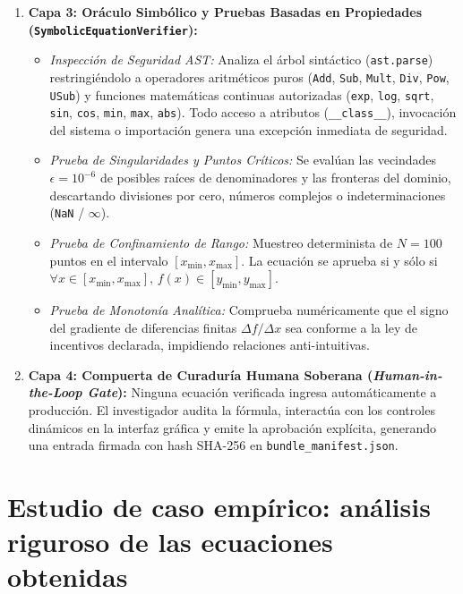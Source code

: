 \documentclass[11pt,a4paper]{article}
\begin{document}
\begin{enumerate}[leftmargin=*]
    \item \textbf{Capa 3: Or\'aculo Simb\'olico y Pruebas Basadas en Propiedades (\texttt{SymbolicEquationVerifier}):}
    \begin{itemize}
        \item \textit{Inspecci\'on de Seguridad AST:} Analiza el \'arbol sint\'actico (\texttt{ast.parse}) restringi\'endolo a operadores aritm\'eticos puros (\texttt{Add}, \texttt{Sub}, \texttt{Mult}, \texttt{Div}, \texttt{Pow}, \texttt{USub}) y funciones matem\'aticas continuas autorizadas (\texttt{exp}, \texttt{log}, \texttt{sqrt}, \texttt{sin}, \texttt{cos}, \texttt{min}, \texttt{max}, \texttt{abs}). Todo acceso a atributos (\texttt{\_\_class\_\_}), invocaci\'on del sistema o importaci\'on genera una excepci\'on inmediata de seguridad.
        \item \textit{Prueba de Singularidades y Puntos Cr\'iticos:} Se eval\'uan las vecindades $\epsilon = 10^{-6}$ de posibles ra\'ices de denominadores y las fronteras del dominio, descartando divisiones por cero, n\'umeros complejos o indeterminaciones (\texttt{NaN} / $\infty$).
        \item \textit{Prueba de Confinamiento de Rango:} Muestreo determinista de $N=100$ puntos en el intervalo $[x_{\min}, x_{\max}]$. La ecuaci\'on se aprueba si y s\'olo si $\forall x \in [x_{\min}, x_{\max}], \, f(x) \in [y_{\min}, y_{\max}]$.
        \item \textit{Prueba de Monoton\'ia Anal\'itica:} Comprueba num\'ericamente que el signo del gradiente de diferencias finitas $\Delta f / \Delta x$ sea conforme a la ley de incentivos declarada, impidiendo relaciones anti-intuitivas.
    \end{itemize}

    \item \textbf{Capa 4: Compuerta de Curadur\'ia Humana Soberana (\textit{Human-in-the-Loop Gate}):}
    Ninguna ecuaci\'on verificada ingresa autom\'aticamente a producci\'on. El investigador audita la f\'ormula, interact\'ua con los controles din\'amicos en la interfaz gr\'afica y emite la aprobaci\'on expl\'icita, generando una entrada firmada con hash SHA-256 en \texttt{bundle\_manifest.json}.
\end{enumerate}

\section{Estudio de caso emp\'irico: an\'alisis riguroso de las ecuaciones obtenidas}
\end{document}
